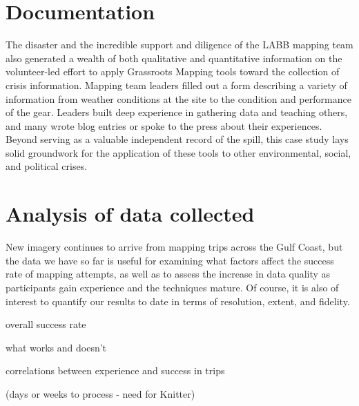 \documentclass[11pt,oneside,notitlepage]{report}
\begin{document}
\section{Documentation}

The disaster and the incredible support and diligence of the LABB mapping team also generated a wealth of both qualitative and quantitative information on the volunteer-led effort to apply Grassroots Mapping tools toward the collection of crisis information. Mapping team leaders filled out a form describing a variety of information from weather conditions at the site to the condition and performance of the gear. Leaders built deep experience in gathering data and teaching others, and many wrote blog entries or spoke to the press about their experiences. Beyond serving as a valuable independent record of the spill, this case study lays solid groundwork for the application of these tools to other environmental, social, and political crises.

\section{Analysis of data collected}

New imagery continues to arrive from mapping trips across the Gulf Coast, but the data we have so far is useful for examining what factors affect the success rate of mapping attempts, as well as to assess the increase in data quality as participants gain experience and the techniques mature. Of course, it is also of interest to quantify our results to date in terms of resolution, extent, and fidelity.  



overall success rate 

what works and doesn't

correlations between experience and success in trips

(days or weeks to process - need for Knitter)
\end{document}
